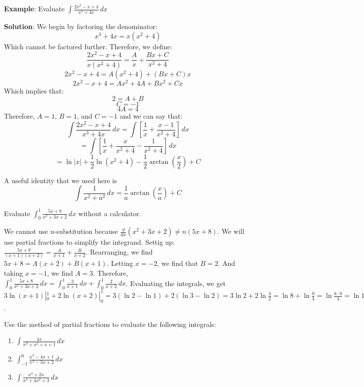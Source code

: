 \textbf{Example}: Evaluate $\int \frac{2x^2 - x + 4}{x^3 + 4x}\,dx$

\textbf{Solution}: We begin by factoring the denominator:
$$x^3 + 4x = x(x^2 + 4)$$
Which cannot be factored further. Therefore, we define:
$$\frac{2x^2 - x + 4}{x(x^2 + 4)} = \frac{A}{x} + \frac{Bx + C}{x^2 + 4}$$
$$2x^2 - x + 4 = A(x^2 + 4) + (Bx + C)x$$
$$2x^2 - x + 4 = Ax^2 + 4A + Bx^2 + Cx$$
Which implies that:
$$2 = A + B$$
$$C = -1$$
$$4A = 4$$
Therefore, $A = 1$, $B = 1$, and $C = -1$ and we can say that:
$$\int \frac{2x^2 - x + 4}{x^3 + 4x}\,dx = \int	\left[ \frac{1}{x} + \frac{x - 
1}{x^2 + 4} \right] \,dx$$
$$= \int \left[ \frac{1}{x} + \frac{x}{x^2 + 4} - \frac{1}{x^2 + 4} \right]\,
dx$$
$$= \ln{|x|} + \frac{1}{2}\ln{(x^2 + 4)} - \frac{1}{2}\arctan{\left( \frac{x}{2} 
\right) } + C$$

A useful identity that we used here is 
$$\int \frac{1}{x^2 + a^2}\,dx = \frac{1}{a} \arctan{\left( \frac{x}{a} \right)} 
+ C$$

\begin{Exercise}[label = int_meth2]
	Evaluate $\int_0^1 \frac{5x + 8}{x^2 + 3x + 2}\,dx$ without a 
	calculator. 
	\vspace{30mm}
\end{Exercise}

\begin{Answer}[ref=int_meth2]
	We cannot use u-substitution because $\frac{d}{dx}(x^2 + 3x + 2) \neq 
	n(5x + 8)$. We will use partial fractions to simplify the integrand. 
	Settig up: $\frac{5x + 8}{(x + 1)(x + 2)} = \frac{A}{x + 1} + 
	\frac{B}{x + 2}$. Rearranging, we find $5x + 8 = A(x + 2) + B(x + 1)$. 
	Letting $x = -2$, we find that $B = 2$. And taking $x = -1$, we find 
	$A = 3$. Therefore, $\int_0^1 \frac{5x + 8}{x^2 + 3x + 2}\,dx = \int
	_0^1 \frac{3}{x + 1}\,dx + \int_0^1 \frac{2}{x + 2}\,dx$. Evaluating 
	the integrals, we get $3\ln{(x + 1)}|_0^1 + 2\ln{(x + 2)}|_0^1 = 3(
	\ln{2} - \ln{1}) + 2(\ln{3} - \ln{2}) = 3\ln{2} + 2\ln{\frac{3}{2}} 
	= \ln{8} + \ln{\frac{9}{4}} = \ln{\frac{8 \cdot 9}{4}} = \ln{18}$. 
\end{Answer}

\begin{Exercise}[label = partfrac]
Use the method of partial fractions to evaluate the following integrals:
\begin{enumerate}
\item $\int \frac{4x}{x^3 + x^2 + x + 1}\,dx$
\item $\int_{-1}^0 \frac{x^3 - 4x + 1}{x^2 - 3x + 2}\,dx$
\item $\int \frac{x^3 + 2x}{x^4 + 4x^2 + 3}\,dx$
\end{enumerate}
\vspace{50mm}
\end{Exercise}

